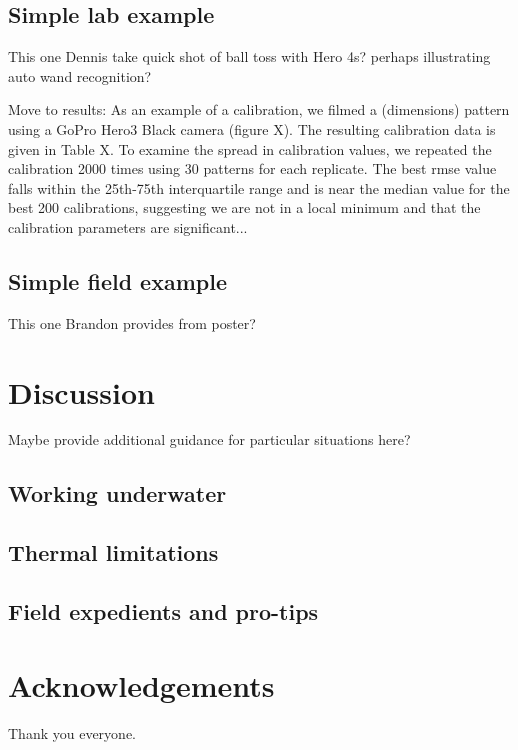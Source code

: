\documentclass[fleqn,10pt]{wlpeerj}
\begin{document}
\subsection*{Simple lab example}
This one Dennis take quick shot of ball toss with Hero 4s? perhaps illustrating auto wand recognition?

Move to results: As an example of a calibration, we filmed a (dimensions) pattern using a GoPro Hero3 Black camera (figure X).  The resulting calibration data is given in Table X. To examine the spread in calibration values, we repeated the calibration 2000 times using 30 patterns for each replicate. The best rmse value falls within the 25th-75th interquartile range and is near the median value for the best 200 calibrations, suggesting we are not in a local minimum and that the calibration parameters are significant...   

\subsection*{Simple field example}
This one Brandon provides from poster?

\section*{Discussion}
Maybe provide additional guidance for particular situations here?
\subsection*{Working underwater}

\subsection*{Thermal limitations}
\subsection*{Field expedients and pro-tips}

\section*{Acknowledgements}
Thank you everyone.


\end{document}
